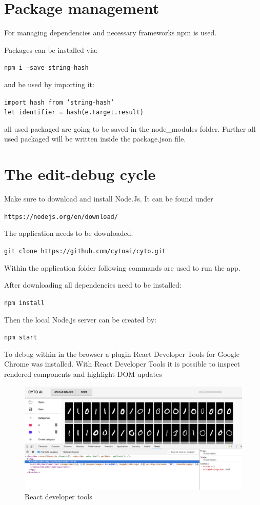 \section{Package management}
For managing dependencies and necessary frameworks npm is used. 

Packages can be installed via:

	\texttt{npm i ---save string-hash}

and be used by importing it:

	\texttt{import hash from 'string-hash'} \\
	\texttt{let identifier = hash(e.target.result)}

all used packaged are going to be saved in the node\_modules
folder. Further all used packaged will be written inside the
package.json file.


\section{The edit-debug cycle}

Make sure to download and install Node.Js. It can be found under

\texttt{https://nodejs.org/en/download/}

The application needs to be downloaded:

\texttt{git clone https://github.com/cytoai/cyto.git}

Within the application folder following commands are used to
run the app.

After downloading all dependencies need to be installed:

\texttt{npm install}

Then the local Node.js server can be created by:

\texttt{npm start}

To debug within in the browser a plugin React Developer Tools
for Google Chrome was installed. With React Developer Tools
it is possible to inspect rendered components and highlight DOM updates 

\begin{figure}[H]
	\centering
	\includegraphics[width=0.9\linewidth]{bilder/cyto/ReactDebug.png}
	\caption{React developer tools}
	\label{fig:Developer Tools}
\end{figure}

